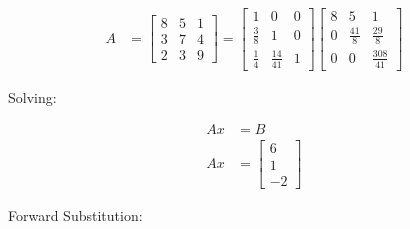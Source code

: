 	\begin{align}
		A &= \begin{bmatrix}
				8 & 5 & 1 \\[0.3em]
				3 & 7 & 4 \\[0.3em]
				2 & 3 & 9
			\end{bmatrix}
			=
			\begin{bmatrix}
				1 & 0 & 0 \\[0.3em]
				\frac{3}{8} & 1 & 0 \\[0.3em]
				\frac{1}{4} & \frac{14}{41} & 1
			\end{bmatrix}
			\begin{bmatrix}
				8 & 5 & 1 \\[0.3em]
				0 & \frac{41}{8} & \frac{29}{8} \\[0.3em]
				0 & 0 & \frac{308}{41}
			\end{bmatrix}&
	\label{eq:51doolittle}
	\end{align}

	Solving:

	\begin{align}
		Ax &= B& \\
		Ax &= \begin{bmatrix}
				6 \\[0.3em]
				1 \\[0.3em]
				-2
			\end{bmatrix}&
	\label{eq:51ax}
	\end{align}

	Forward Substitution:


